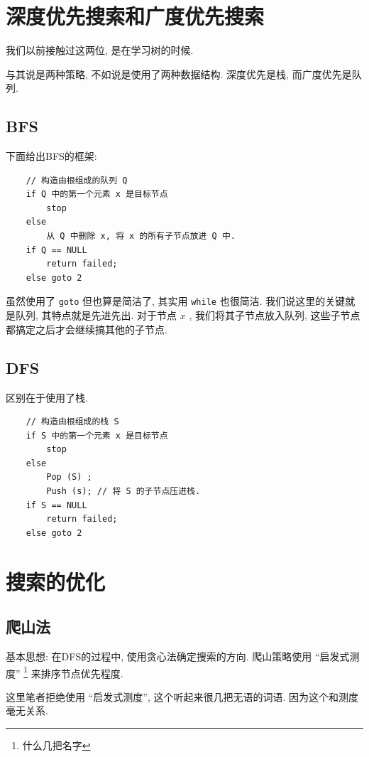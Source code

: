 \documentclass[a4paper, 10pt]{ctexbook} %
\begin{document}
\tableofcontents
\chapter{深度优先搜索和广度优先搜索}
我们以前接触过这两位, 是在学习树的时候.

与其说是两种策略, 不如说是使用了两种数据结构. 
深度优先是栈, 而广度优先是队列.

\section{BFS}
下面给出BFS的框架:

\begin{verbatim}
    // 构造由根组成的队列 Q
    if Q 中的第一个元素 x 是目标节点
        stop
    else 
        从 Q 中删除 x, 将 x 的所有子节点放进 Q 中.
    if Q == NULL 
        return failed;
    else goto 2
\end{verbatim}
虽然使用了 \verb|goto| 但也算是简洁了, 其实用 \verb|while| 也很简洁. 
我们说这里的关键就是队列, 其特点就是先进先出. 
对于节点 $x$ , 我们将其子节点放入队列, 这些子节点都搞定之后才会继续搞其他的子节点.

\section{DFS}
区别在于使用了栈.
\begin{verbatim}
    // 构造由根组成的栈 S
    if S 中的第一个元素 x 是目标节点
        stop
    else 
        Pop (S) ; 
        Push (s); // 将 S 的子节点压进栈.
    if S == NULL 
        return failed;
    else goto 2
\end{verbatim}
\chapter{搜索的优化}
\section{爬山法}
基本思想: 
在DFS的过程中, 使用贪心法确定搜索的方向. 爬山策略使用 ``启发式测度'' \footnote{什么几把名字} 来排序节点优先程度. 

这里笔者拒绝使用 ``启发式测度'', 这个听起来很几把无语的词语. 因为这个和测度毫无关系.
\end{document}
